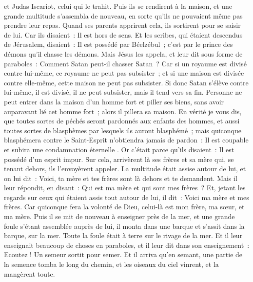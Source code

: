 \begin{multicols}{2}
et Judas Iscariot, celui qui le trahit.
Puis ils se rendirent à la maison, et une grande multitude s'assembla de nouveau, en sorte qu'ils ne pouvaient même pas prendre leur repas.
Quand ses parents apprirent cela, ils sortirent pour se saisir de lui. Car ils disaient~: Il est hors de sens.
Et les scribes, qui étaient descendus de Jérusalem, disaient~: Il est possédé par Béelzébul~; c'est par le prince des démons qu'il chasse les démons.
Mais Jésus les appela, et leur dit sous forme de paraboles~: Comment Satan peut-il chasser Satan~?
Car si un royaume est divisé contre lui-même, ce royaume ne peut pas subsister~;
et si une maison est divisée contre elle-même, cette maison ne peut pas subsister.
Si donc Satan s'élève contre lui-même, il est divisé, il ne peut subsister, mais il tend vers sa fin.
Personne ne peut entrer dans la maison d'un homme fort et piller ses biens, sans avoir auparavant lié cet homme fort~; alors il pillera sa maison.
En vérité je vous dis, que toutes sortes de péchés seront pardonnés aux enfants des hommes, et aussi toutes sortes de blasphèmes par lesquels ils auront blasphémé~;
mais quiconque blasphémera contre le Saint-Esprit n'obtiendra jamais de pardon~: Il est coupable et subira une condamnation éternelle .
Or c'était parce qu'ils disaient~: Il est possédé d'un esprit impur.
Sur cela, arrivèrent là ses frères et sa mère qui, se tenant dehors, ils l'envoyèrent appeler. La multitude était assise autour de lui,
et on lui dit~: Voici, ta mère et tes frères sont là dehors et te demandent.
Mais il leur répondit, en disant~: Qui est ma mère et qui sont mes frères~?
Et, jetant les regards sur ceux qui étaient assis tout autour de lui, il dit~: Voici ma mère et mes frères.
Car quiconque fera la volonté de Dieu, celui-là est mon frère, ma sœur, et ma mère.
\VerseOne{}Puis il se mit de nouveau à enseigner près de la mer, et une grande foule s'étant assemblée auprès de lui, il monta dans une barque et s'assit dans la barque, sur la mer. Toute la foule était à terre sur le rivage de la mer.
Et il leur enseignait beaucoup de choses en paraboles, et il leur dit dans son enseignement~:
Ecoutez ! Un semeur sortit pour semer.
Et il arriva qu'en semant, une partie de la semence tomba le long du chemin, et les oiseaux du ciel vinrent, et la mangèrent toute.

\end{multicols}
